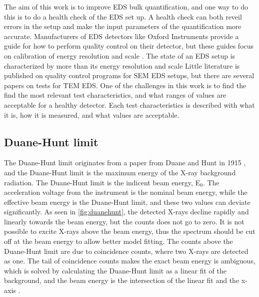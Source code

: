 
The aim of this work is to improve EDS bulk quantification, and one way to do this is to do a health check of the EDS set up.
A health check can both reveil errors in the setup and make the input parameters of the quantification more accurate.
Manufacturers of EDS detectors like Oxford Instruments provide a guide for how to perform quality control on their detector, but these guides focus on calibration of energy resolution and scale \cite{aztec_manual}.
The state of an EDS setup is characterized by more than its energy resolution and scale \cite{goldstein_scanning_2018}
Little literature is published on quality control programs for SEM EDS setups, but there are several papers on tests for TEM EDS.
One of the challenges in this work is to find the find the most relevant test characteristics, and what ranges of values are acceptable for a healthy detector.
Each test characteristics is described with what it is, how it is measured, and what values are acceptable.



\subsection{Duane-Hunt limit}
\label{theory:qc:duanehunt}

The Duane-Hunt limit originates from a paper from Duane and Hunt in 1915 \cite{Duane_Hunt_1915}, and the Duane-Hunt limit is the maximum energy of the X-ray background radiation.
The Duane-Hunt limit is the indicent beam energy, E$_0$. 
The acceleration voltage from the instrument is the nominal beam energy, while the effective beam energy is the Duane-Hunt limit, and these two values can deviate significantly.
As seen in \cref{fig:duanehunt}, the detected X-rays decline rapidly and linearly towards the beam energy, but the counts does not go to zero.
It is not possible to excite X-rays above the beam energy, thus the spectrum should be cut off at the beam energy to allow better model fitting.
The counts above the Duane-Hunt limit are due to coincidence counts, where two X-rays are detected as one.
The tail of coincidence counts makes the exact beam energy is ambiguous, which is solved by calculating the Duane-Hunt limit as a linear fit of the background, and the beam energy is the intersection of the linear fit and the x-axis \cite{software_dtsaii} \cite[Ch. 9.1.3]{goldstein_scanning_2018}.

